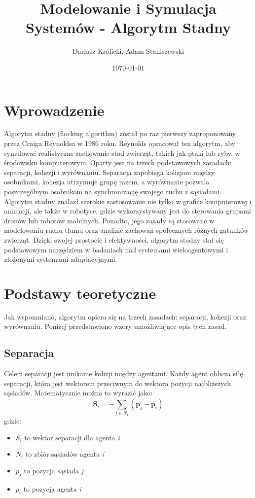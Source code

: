 \documentclass[a4paper,12pt]{article}
\title{Modelowanie i Symulacja Systemów - Algorytm Stadny}
\author{Dariusz Królicki, Adam Staniszewski}
\date{\today}
\begin{document}
\maketitle

\section{Wprowadzenie}
Algorytm stadny (flocking algorithm) został po raz pierwszy zaproponowany przez Craiga Reynoldsa w 1986 roku. Reynolds opracował ten algorytm, aby symulować realistyczne zachowanie stad zwierząt, takich jak ptaki lub ryby, w środowisku komputerowym. Oparty jest na trzech podstawowych zasadach: separacji, kohezji i wyrównaniu. Separacja zapobiega kolizjom między osobnikami, kohezja utrzymuje grupę razem, a wyrównanie pozwala poszczególnym osobnikom na synchronizację swojego ruchu z sąsiadami.\\

Algorytm stadny znalazł szerokie zastosowanie nie tylko w grafice komputerowej i animacji, ale także w robotyce, gdzie wykorzystywany jest do sterowania grupami dronów lub robotów mobilnych. Ponadto, jego zasady są stosowane w modelowaniu ruchu tłumu oraz analizie zachowań społecznych różnych gatunków zwierząt. Dzięki swojej prostocie i efektywności, algorytm stadny stał się podstawowym narzędziem w badaniach nad systemami wieloagentowymi i złożonymi systemami adaptacyjnymi.
\section{Podstawy teoretyczne}
Jak wspomniano, algorytm opiera się na trzech zasadach: separacji, kohezji oraz wyrównaniu. Poniżej przedstawiono wzory umożliwiające opis tych zasad.
\subsection{Separacja}
Celem separacji jest unikanie kolizji między agentami. Każdy agent oblicza siłę separacji, która jest wektorem przeciwnym do wektora pozycji najbliższych sąsiadów. Matematycznie można to wyrazić jako:
\begin{equation}
    \mathbf{S}_i = - \sum_{j \in N_i} (\mathbf{p}_j - \mathbf{p}_i)
\end{equation}
gdzie:
\begin{itemize}
    \item $S_{i}$ to wektor separacji dla agenta \textit{i}
    \item $N_{i}$ to zbiór sąsiadów agenta \textit{i}
    \item $p_{j}$ to pozycja sąsiada \textit{j}
    \item $p_{i}$ to pozycja agenta \textit{i}
\end{itemize}
\end{document}
